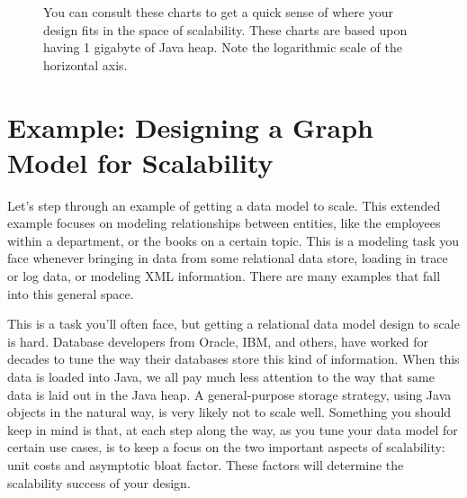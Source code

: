 \begin{figure}
   \caption{You can consult these charts to get a quick sense of where your
   design fits in the space of scalability. These charts are based upon having 1
   gigabyte of Java heap. Note the logarithmic scale of the horizontal axis.}
\end{figure}

\section{Example: Designing a Graph Model for Scalability}

Let's step through an example of getting a data model to scale. This extended
example focuses on modeling relationships between entities, like the employees
within a department, or the books on a certain topic. This is a modeling task
you face whenever bringing in data from some relational data store, loading in
trace or log data, or modeling XML information. There are many examples that
fall into this general space.

This is a task you'll often face, but getting a relational data model design to
scale is hard. Database developers from Oracle, IBM, and others, have worked for
decades to tune the way their databases store this kind of information. When
this data is loaded into Java, we all pay much less attention to the way that
same data is laid out in the Java heap. A general-purpose storage strategy,
using Java objects in the natural way, is very likely not to scale well.
Something you should keep in mind is that, at each step along the way, as you
tune your data model for certain use cases, is to keep a focus on the two
important aspects of scalability: unit costs and asymptotic bloat factor. These
factors will determine the scalability success of your design.

